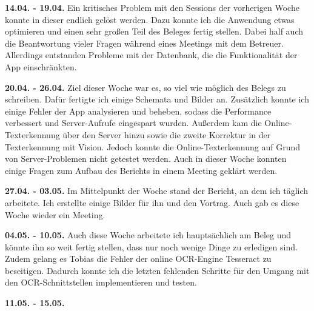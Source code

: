 \documentclass[notables, nomenclature, oneside, 150]{HSMW-Thesis}
\begin{document}
	\textbf{14.04. - 19.04.}
	Ein kritisches Problem mit den Sessions der vorherigen Woche konnte in dieser endlich gelöst werden. Dazu konnte ich die Anwendung etwas optimieren und einen sehr großen Teil des Beleges fertig stellen. Dabei half auch die Beantwortung vieler Fragen während eines Meetings mit dem Betreuer. Allerdings entstanden Probleme mit der Datenbank, die die Funktionalität der App einschränkten.
	
	\textbf{20.04. - 26.04.}
	Ziel dieser Woche war es, so viel wie möglich des Belegs zu schreiben. Dafür fertigte ich einige Schemata und Bilder an. Zusätzlich konnte ich einige Fehler der App analysieren und beheben, sodass die Performance verbessert und Server-Aufrufe eingespart wurden. Außerdem kam die Online-Texterkennung über den Server hinzu sowie die zweite Korrektur in der Texterkennung mit Vision. Jedoch konnte die Online-Texterkennung auf Grund von Server-Problemen nicht getestet werden. Auch in dieser Woche konnten einige Fragen zum Aufbau des Berichts in einem Meeting geklärt werden. 
	
	\textbf{27.04. - 03.05.}
	Im Mittelpunkt der Woche stand der Bericht, an dem ich täglich arbeitete. Ich erstellte einige Bilder für ihn und den Vortrag. Auch gab es diese Woche wieder ein Meeting.
	
	\textbf{04.05. - 10.05.}
	Auch diese Woche arbeitete ich hauptsächlich am Beleg und könnte ihn so weit fertig stellen, dass nur noch wenige Dinge zu erledigen sind. Zudem gelang es Tobias die Fehler der online OCR-Engine Tesseract zu beseitigen. Dadurch konnte ich die letzten fehlenden Schritte für den Umgang mit den OCR-Schnittstellen implementieren und testen.
	
	\textbf{11.05. - 15.05.}




\end{document}
